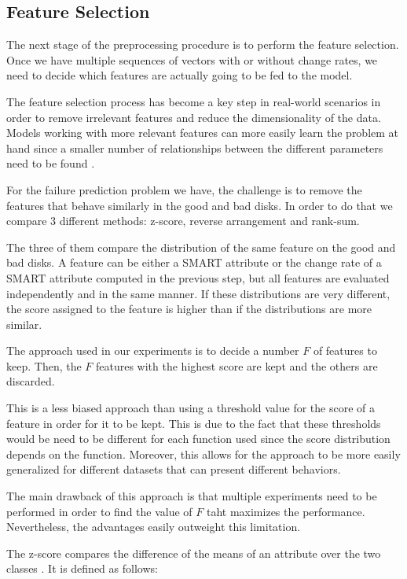 \subsection{Feature Selection}\label{subsec:feature_selection}

The next stage of the preprocessing procedure is to perform the feature selection.
Once we have multiple sequences of vectors with or without change rates, we need to decide which features are actually going to be fed to the model.

The feature selection process has become a key step in real-world scenarios in order to remove irrelevant features and reduce the dimensionality of the data.
Models working with more relevant features can more easily learn the problem at hand since a smaller number of relationships between the different parameters need to be found \cite{kumar2014feature}.

For the failure prediction problem we have, the challenge is to remove the features that behave similarly in the good and bad disks.
In order to do that we compare 3 different methods: z-score, reverse arrangement and rank-sum.

The three of them compare the distribution of the same feature on the good and bad disks.
A feature can be either a SMART attribute or the change rate of a SMART attribute computed in the previous step, but all features are evaluated independently and in the same manner.
If these distributions are very different, the score assigned to the feature is higher than if the distributions are more similar.

The approach used in our experiments is to decide a number $F$ of features to keep.
Then, the $F$ features with the highest score are kept and the others are discarded.

This is a less biased approach than using a threshold value for the score of a feature in order for it to be kept.
This is due to the fact that these thresholds would be need to be different for each function used since the score distribution depends on the function.
Moreover, this allows for the approach to be more easily generalized for different datasets that can present different behaviors.

The main drawback of this approach is that multiple experiments need to be performed in order to find the value of $F$ taht maximizes the performance.
Nevertheless, the advantages easily outweight this limitation.

The z-score compares the difference of the means of an attribute over the two classes \cite{Murray2005}.
It is defined as follows:

